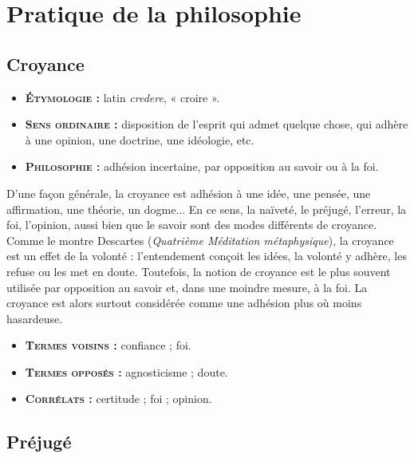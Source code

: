
\section{Pratique de la philosophie}

\subsection{Croyance}

{\footnotesize
\begin{itemize}[leftmargin=1cm, label=, itemsep=1pt]
\item {\bf \textsc{Étymologie} :} latin {\it credere}, « croire ».
\item {\bf \textsc{Sens ordinaire} :} disposition
 de l'esprit qui admet quelque
chose, qui adhère à une opinion,
une doctrine, une idéologie, etc.
\item {\bf \textsc{Philosophie} :} adhésion incertaine,
par opposition au savoir ou à la foi.
\end{itemize}
}

D'une façon générale, la croyance est
adhésion à une idée, une pensée, une
affirmation, une théorie, un dogme... En
ce sens, la naïveté, le préjugé, l'erreur,
la foi, l’opinion, aussi bien que le
savoir sont des modes différents de
croyance. Comme le montre Descartes
({\it Quatrième Méditation métaphysique}),
la croyance est un effet de la volonté :
l'entendement conçoit les idées, la
volonté y adhère, les refuse ou les met
en doute. Toutefois, la notion de
croyance est le plus souvent utilisée par
opposition au savoir et, dans une
moindre mesure, à la foi. La croyance
est alors surtout considérée comme une
adhésion plus où moins hasardeuse.

{\footnotesize
\begin{itemize}[leftmargin=1cm, label=, itemsep=1pt]
\item {\bf \textsc{Termes voisins} :} confiance ; foi.
\item {\bf \textsc{Termes opposés} :} agnosticisme ;
doute.
\item {\bf \textsc{Corrélats} :}  certitude ;
foi ; opinion.
\end{itemize}
}


\subsection{Préjugé}

